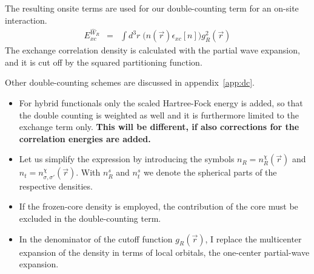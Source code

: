 \documentclass[11pt,a4paper]{report}
\begin{document}
The resulting onsite terms are used for our double-counting term for
an on-site interaction. 
\begin{eqnarray}
E_{xc}^{\hat{W}_R} &=& \int d^3r\; \biggl(n(\vec{r})
\epsilon_{xc}[n]\biggr) g_R^2(\vec{r})
\end{eqnarray}
The exchange correlation density is calculated with the partial wave
expansion, and it is cut off by the squared partitioning function.

Other double-counting schemes are discussed in appendix~\ref{app:dc}.

\begin{itemize}
\item For hybrid functionals only the scaled Hartree-Fock energy is
  added, so that the double counting is weighted as well and it is
  furthermore limited to the exchange term only. \textbf{This will be
    different, if also corrections for the correlation energies are
    added.}
%
\item Let us simplify the expression by introducing the symbols
  $n_R=n^\chi_R(\vec{r})$ and $n_t=n^\chi_{\sigma,\sigma'}(\vec{r})$.
  With $n^s_R$ and $n^s_t$ we denote the spherical parts of the
  respective densities.
%
\item If the frozen-core density is employed, the contribution of the
  core must be excluded in the double-counting term.
%
\item In the denominator of the cutoff function $g_R(\vec{r})$, I
  replace the multicenter expansion of the density in terms of local
  orbitals, the one-center partial-wave expansion.
\end{itemize}
\end{document}
